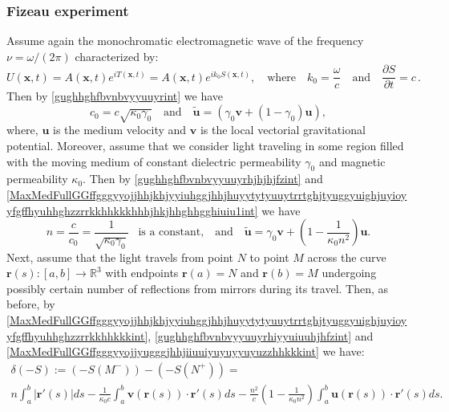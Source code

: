\documentclass{article}
\theoremstyle{definition}
\theoremstyle{remark}
\renewcommand{\vec}[1]{\mathbf{#1}}
\newcommand{\er}{\eqref}
\newcommand{\er}{\eqref}
\begin{document}
\subsubsection{Fizeau experiment}\label{seGOfzint}
Assume again the monochromatic electromagnetic wave of the frequency
$\nu=\omega/(2\pi)$ characterized by:
\begin{equation}\label{MaxVacFullPPNmmmffffffiuiuhjuughbghhuiiujjhhjjhjhhjhjjhhjhjjhfzint}
U(\vec x,t)=A(\vec x,t)e^{iT(\vec x,t)}=A(\vec x,t)e^{ik_0S(\vec
x,t)},\quad\text{where}\quad
k_0=\frac{\omega}{c}\quad\text{and}\quad\frac{\partial S}{\partial
t}=c\,.
\end{equation}
Then by \er{gughhghfbvnbvyyuuyrint} we have
\begin{equation}\label{gughhghfbvnbvyyuuyrhjhjhjfzint}
c_0=c\sqrt{\kappa_0\gamma_0}\quad\text{and}\quad\vec {\tilde
u}=\left(\gamma_0\vec v+(1-\gamma_0)\vec u\right),
\end{equation}
where, $\vec u$ is the medium velocity and $\vec v$ is the local
vectorial gravitational potential. Moreover, assume that we consider
light traveling in some region filled with the moving medium of
constant dielectric permeability $\gamma_0$ and magnetic
permeability $\kappa_0$. Then by \er{gughhghfbvnbvyyuuyrhjhjhjfzint}
and
\er{MaxMedFullGGffgggyyojjhhjkhjyyiuhggjhhjhuyytytyuuytrrtghjtyuggyuighjuyioyyfgffhyuhhghzzrrkkhhkkkhhhjhkjhhghhgghiuiu1int}
we have
\begin{equation}\label{gughhghfbvnbvyyuuyrhiyyuiuuhjhfzint}
n=\frac{c}{c_0}=\frac{1}{\sqrt{\kappa_0\gamma_0}}\;\;\;\text{is a
constant,}\quad\text{and}\quad\vec {\tilde u}=\gamma_0\vec
v+\left(1-\frac{1}{\kappa_0n^2}\right)\vec u.
\end{equation}
Next, assume that the light travels from point $N$ to point $M$
across the curve $\vec r(s):[a,b]\to\mathbb{R}^3$ with endpoints
$\vec r(a)=N$ and $\vec r(b)=M$ undergoing possibly certain number
of reflections from mirrors during its travel. Then, as before, by
\er{MaxMedFullGGffgggyyojjhhjkhjyyiuhggjhhjhuyytytyuuytrrtghjtyuggyuighjuyioyyfgffhyuhhghzzrrkkhhkkkint},
\er{gughhghfbvnbvyyuuyrhiyyuiuuhjhfzint} and
\er{MaxMedFullGGffgggyyojjyugggjhhjiiuuiyuyuyyuyuzzhhkkkint} we
have:
\begin{multline}\label{MaxMedFullGGffgggyyojjhhjkhjyyiuhggjhhjhuyytytyuuytrrtghjtyuggyuighjuyioyyfgffhyuhhghzzrrkkhhkkkhjjhfzint}
\delta(-S):=\left(-S(M^-)\right)- \left(-S(N^+)\right)=\\
n\int_a^b \left|\vec r'(s)\right|ds-\frac{1}{\kappa_0 c}\int_a^b\vec
v\left(\vec r(s)\right)\cdot\vec
r'(s)ds-\frac{n^2}{c}\left(1-\frac{1}{\kappa_0n^2}\right)\int_a^b\vec
u\left(\vec r(s)\right)\cdot\vec r'(s)ds.
\end{multline}
\end{document}
